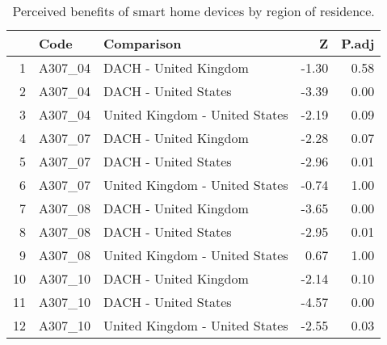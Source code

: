 \begin{table}[ht]
\centering
\begin{tabular}{rllrr}
  \hline
 & Code & Comparison & Z & P.adj \\ 
  \hline
1 & A307\_04 & DACH - United Kingdom & -1.30 & 0.58 \\ 
  2 & A307\_04 & DACH - United States & -3.39 & 0.00 \\ 
  3 & A307\_04 & United Kingdom - United States & -2.19 & 0.09 \\ 
   \hline
4 & A307\_07 & DACH - United Kingdom & -2.28 & 0.07 \\ 
  5 & A307\_07 & DACH - United States & -2.96 & 0.01 \\ 
  6 & A307\_07 & United Kingdom - United States & -0.74 & 1.00 \\ 
   \hline
7 & A307\_08 & DACH - United Kingdom & -3.65 & 0.00 \\ 
  8 & A307\_08 & DACH - United States & -2.95 & 0.01 \\ 
  9 & A307\_08 & United Kingdom - United States & 0.67 & 1.00 \\ 
   \hline
10 & A307\_10 & DACH - United Kingdom & -2.14 & 0.10 \\ 
  11 & A307\_10 & DACH - United States & -4.57 & 0.00 \\ 
  12 & A307\_10 & United Kingdom - United States & -2.55 & 0.03 \\ 
   \hline
\end{tabular}
\caption{Perceived benefits of smart home devices by region of residence. } 
\end{table}
